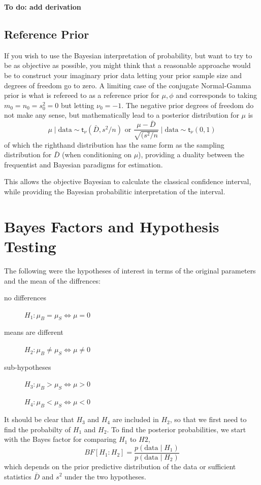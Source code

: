 \documentclass[11pt]{article}
\def\BF{\textit{BF}}
\newcommand{\St}{\textsf{t}}
\def\data{\text{data}}
\begin{document}
{\bf To do: add derivation}

\subsection{Reference Prior}

If you wish to use the Bayesian interpretation of probability, but want to try to be as objective as possible, you might think that a reasonable approache would be to construct your imaginary prior data letting your prior sample size and degrees of freedom go to zero.  A limiting case of the conjugate Normal-Gamma prior is what is refereed to as a reference prior for $\mu, \phi$ and corresponds to taking $m_0 = n_0 = s^2_0 = 0$ but letting $\nu_0 = -1$.  The negative prior degrees of freedom do not make any sense, but mathematically lead to 
a posterior distribution for $\mu$ is 
$$
\mu \mid \data  \sim \St_{\nu}(\bar{D}, s^2/n)  \text{ or }  \frac{\mu - \bar{D}}{\sqrt{(s^2/n}}  \mid \data \sim \St_{\nu}(0,1)
$$
of which the righthand distribution has the same form as the sampling distribution  for $\bar{D}$ (when conditioning on $\mu$), providing a duality between the frequentist and Bayesian paradigms for estimation.

This allows the objective Bayesian to calculate the classical confidence interval, while providing the Bayesian probabilitic interpretation of the interval.

\section*{Bayes Factors and Hypothesis Testing}

The following were the hypotheses of interest in terms of the original parameters and the mean of the diffrences:
\begin{description}%
\item [no differences] $H_1:  \mu_B = \mu_S  \Leftrightarrow \mu = 0 $   
\item [means are different] $H_2:  \mu_B \neq \mu_S \Leftrightarrow \mu  \neq 0 $ 
\item [sub-hypotheses]  $H_{3}:  \mu_B > \mu_S \Leftrightarrow \mu  > 0 $ 
\item [ ] $H_{4}:  \mu_B < \mu_S \Leftrightarrow \mu  < 0 $
\end{description}

It should be clear that $H_3$ and $H_4$ are included in $H_2$, so that we first need to find the probabilty of $H_1$ and $H_2$.    To find the posterior probabilities, we start with the Bayes factor for comparing $H_1$  to $H2$,
$$
\BF[H_1: H_2] = \frac{p(\data \mid H_1)} {p(\data \mid H_2)}
$$
which depends on the prior predictive distribution of the data or sufficient statistics $\bar{D}$ and $s^2$ under the two hypotheses. 
\end{document}

